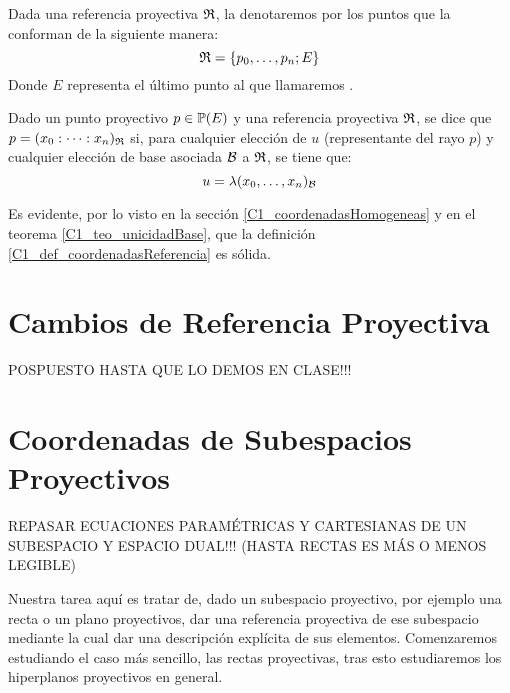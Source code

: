 Dada una referencia proyectiva $\mathfrak{R}$, la denotaremos por los puntos que la conforman de la siguiente manera:
\begin{equation}
\label{C1_eq_notacionReferencias}
\mathfrak{R}=\{p_0,\dots,p_n;E\}
\end{equation}
Donde $E$ representa el último punto al que llamaremos .
\begin{defi}
	\label{C1_def_coordenadasReferencia}
	Dado un punto proyectivo $p\in\mathbb{P}(E)$ y una referencia proyectiva $\mathfrak{R}$, se dice que $p=(x_0:\dots :x_n)_{\mathfrak{R}}$ si, para cualquier elección de $u$ (representante del rayo $p$) y cualquier elección de base asociada $\mathcal{B}$ a $\mathfrak{R}$, se tiene que:
	\[u=\lambda(x_0,\dots,x_n)_{\mathcal{B}}\]
\end{defi}
Es evidente, por lo visto en la sección \ref{C1_coordenadasHomogeneas} y en el teorema \ref{C1_teo_unicidadBase}, que la definición \ref{C1_def_coordenadasReferencia} es sólida.
\section{Cambios de Referencia Proyectiva}
POSPUESTO HASTA QUE LO DEMOS EN CLASE!!!
\section{Coordenadas de Subespacios Proyectivos}
REPASAR ECUACIONES PARAMÉTRICAS Y CARTESIANAS DE UN SUBESPACIO Y ESPACIO DUAL!!! (HASTA RECTAS ES MÁS O MENOS LEGIBLE)

Nuestra tarea aquí es tratar de, dado un subespacio proyectivo, por ejemplo una recta o un plano proyectivos, dar una referencia proyectiva de ese subespacio mediante la cual dar una descripción explícita de sus elementos. Comenzaremos estudiando el caso más sencillo, las rectas proyectivas, tras esto estudiaremos los hiperplanos proyectivos en general.
